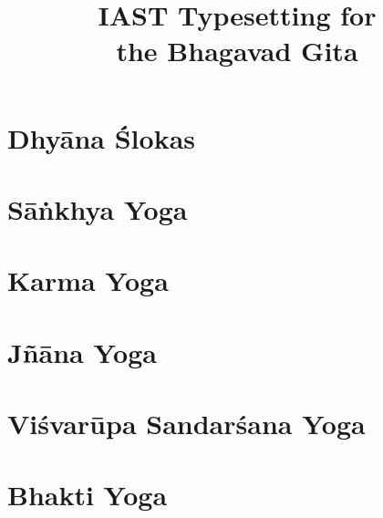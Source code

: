 \documentclass{scrbook}
\title{IAST Typesetting for \\ the Bhagavad Gita}
\author{}
\begin{document}
\maketitle
\frontmatter

\tableofcontents
\newpage

\chapter{Dhyāna Ślokas}


\mainmatter
\setcounter{chapter}{1}

\chapter{Sāṅkhya Yoga}
\begin{multicols}{2}
    
\end{multicols}

\chapter{Karma Yoga}
\begin{multicols}{2}
    
\end{multicols}

\chapter{Jñāna Yoga}
\begin{multicols}{2}
    
\end{multicols}

\setcounter{chapter}{10}

\chapter{Viśvarūpa Sandarśana Yoga}
\begin{multicols}{2}
    
\end{multicols}

\chapter{Bhakti Yoga}
\begin{multicols}{2}
    
\end{multicols}
\end{document}

